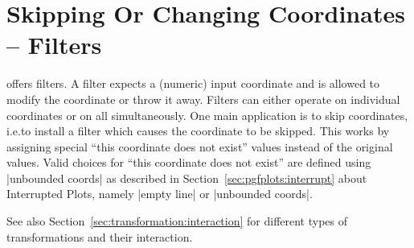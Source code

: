 
\section{Skipping Or Changing Coordinates -- Filters}
\label{sec:filters}

\PGFPlots{} offers filters. A filter expects a (numeric) input coordinate and
is allowed to modify the coordinate or throw it away. Filters can either
operate on individual coordinates or on all simultaneously. One main
application is to skip coordinates, i.e.\@ to install a filter which causes the
coordinate to be skipped. This works by assigning special ``this coordinate
does not exist'' values instead of the original values. Valid choices for
``this coordinate does not exist'' are defined using |unbounded coords| as
described in Section~\ref{sec:pgfplots:interrupt} about Interrupted Plots, namely
|empty line| or |unbounded coords|.

See also Section~\ref{sec:transformation:interaction} for different types of
transformations and their interaction.

